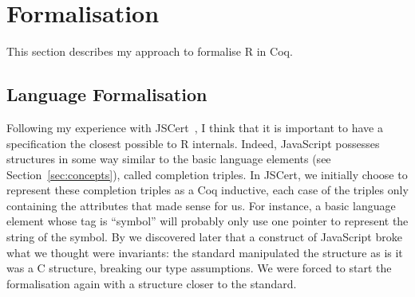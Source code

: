 \documentclass{article}
\newcommand\Coq{Coq}
\newcommand\R{R}
\newcommand\Cn{C}
\begin{document}

\section{Formalisation}

This section describes my approach to formalise \R{} in \Coq{}.

\subsection{Language Formalisation}

Following my experience with JSCert~\parencite{bodin2014trusted},
I think that it is important to have a specification
the closest possible to \R{} internals.
Indeed, JavaScript possesses structures in some way similar
to the basic language elements (see Section~\ref{sec:concepts}),
called completion triples.
In JSCert, we initially choose to represent these completion triples
as a \Coq{} inductive,
each case of the triples only containing the attributes that made sense for us.
For instance, a basic language element whose tag is “symbol”
will probably only use one pointer to represent the string of the symbol.
By we discovered later that a construct of JavaScript %
broke what we thought were invariants:
the standard manipulated the structure as is it was a \Cn{} structure,
breaking our type assumptions.
We were forced to start the formalisation again with a structure
closer to the standard.
\end{document}
